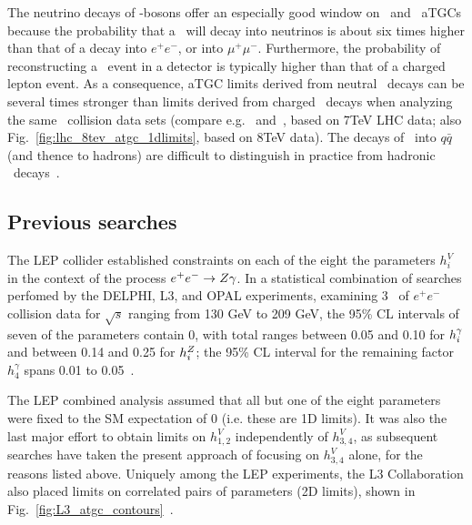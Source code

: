 \documentclass[oneside, letterpaper, 12pt, oldfontcommands]{memoir}
\begin{document}
The neutrino decays of \PZ-bosons offer an especially good window on \PZ\PZ\Pgamma\ and \PZ\Pgamma\Pgamma\ aTGCs because the
probability that a \PZ\ will decay into neutrinos is about six times higher than that of a decay into $e^\mathrm{+}e^\mathrm{-}$, or into $\mu^\mathrm{+}\mu^\mathrm{-}$.
Furthermore, the probability of reconstructing a \zinvg\ event in a detector is typically
higher than that of a charged lepton event. As a consequence, aTGC limits derived from neutral \PZ\ decays can be several times
stronger than limits derived from charged \PZ\ decays when analyzing the same \Pp\Pp\ collision data sets (compare e.g.~\cite{ref:PhysRevD.89.092005} and~\cite{ref:JHEP10(2013)164},
based on 7\unit{TeV} LHC data; also Fig.~\ref{fig:lhc_8tev_atgc_1dlimits}, based on 8\unit{TeV} data).
The decays of \PZ\ into $q\bar{q}$ (and thence to hadrons) are difficult to distinguish in practice from hadronic \PW\ decays~\cite{ref:RevModPhys.89.035008}.

\subsection{Previous searches} \label{sec:introduction_aTGC_previous_searches}
The LEP collider established constraints on each of the eight the parameters $h_{i}^{V}$ in the context of the process $e^{\mathrm{+}}e^{\mathrm{-}} \to Z\gamma$.
In a statistical combination of searches perfomed by the DELPHI, L3, and OPAL experiments, examining 3 \fbinv\ of $e^{\mathrm{+}}e^{\mathrm{-}}$ collision data
for $\sqrt{s}$ ranging from 130 GeV to 209 GeV, the 95\% CL intervals of seven of the parameters contain 0, with total ranges between 0.05 and 0.10 for $h_{i}^{\gamma}$
and between 0.14 and 0.25 for $h_{i}^{Z}$; the 95\% CL interval for the remaining factor $h_{4}^{\gamma}$ spans 0.01 to 0.05~\cite{ref:j.physrep.2013.07.004}.

The LEP combined analysis assumed that all but one of the eight parameters were fixed to the SM expectation of 0 (i.e. these are 1D limits).
It was also the last major effort to obtain limits on $h_{1,2}^{V}$ independently of $h_{3,4}^{V}$,
as subsequent searches have taken the present approach of focusing on $h_{3,4}^{V}$ alone, for the reasons listed above.
Uniquely among the LEP experiments, the L3 Collaboration also placed limits on correlated pairs of parameters (2D limits), shown in Fig.~\ref{fig:L3_atgc_contours}~\cite{ref:j.physletb.2004.07.002}.
\end{document}
